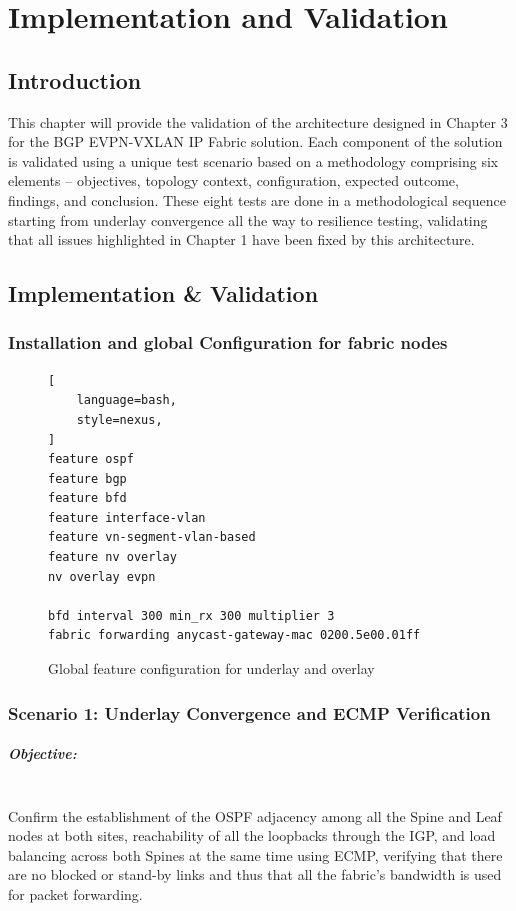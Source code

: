 \chapter{Implementation and Validation}
\section{Introduction}
This chapter will provide the validation of the architecture designed in Chapter 3 for the BGP EVPN-VXLAN IP Fabric solution. Each component of the solution is validated using a unique test scenario based on a methodology comprising six elements – objectives, topology context, configuration, expected outcome, findings, and conclusion. These eight tests are done in a methodological sequence starting from underlay convergence all the way to resilience testing, validating that all issues highlighted in Chapter 1 have been fixed by this architecture.

\section{Implementation \& Validation}
\subsection{Installation and global Configuration for fabric nodes}
\begin{figure}[!htbp]
\centering
\begin{lstlisting}[
    language=bash,
    style=nexus,
]
feature ospf
feature bgp
feature bfd
feature interface-vlan
feature vn-segment-vlan-based
feature nv overlay
nv overlay evpn

bfd interval 300 min_rx 300 multiplier 3
fabric forwarding anycast-gateway-mac 0200.5e00.01ff
\end{lstlisting}
\caption{Global feature configuration for underlay and overlay}
\label{fig:global-config}
\end{figure}

\subsection{Scenario 1: Underlay Convergence and ECMP Verification}
\paragraph{Objective:}~\\
Confirm the establishment of the OSPF adjacency among all the Spine and Leaf nodes at both sites, reachability of all the loopbacks through the IGP, and load balancing across both Spines at the same time using ECMP, verifying that there are no blocked or stand-by links and thus that all the fabric’s bandwidth is used for packet forwarding.

